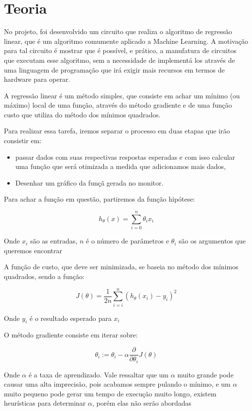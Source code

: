 \section{Teoria}

No projeto, foi desenvolvido um circuito que realiza o algoritmo de regressão linear, 
que é um algoritmo comumente aplicado a Machine Learning. 
A motivação para tal circuito é mostrar que é possível, e prático, 
a manufatura de circuitos que executam esse algoritmo, 
sem a necessidade de implementá los através de uma linguagem de programação que 
irá exigir mais recursos em termos de hardware para operar.

A regressão linear é um método simples, que consiste em achar um mínimo (ou máximo) 
local de uma função, através do método gradiente e de uma função custo 
que utiliza do método dos mínimos quadrados.

Para realizar essa tarefa, iremos separar o processo em duas etapas que irão consistir em: 

\begin{itemize}
    \item passar dados com suas respectivas respostas esperadas e com isso calcular uma 
            função que será otimizada a medida que adicionamos mais dados, 
    \item Desenhar um gráfico da funçã gerada no monitor.
\end{itemize}

Para achar a função em questão, partiremos da função hipótese:

$$h_\theta (x) = \sum_{i=0}^{n} \theta_i x_i$$

Onde $x_i$ são as entradas, $n$ é o número de parâmetros e 
$\theta_i$ são os argumentos que queremos encontrar

A função de custo, que deve ser minimizada, se baseia no método
dos mínimos quadrados, sendo a função:

$$ J(\theta) = \frac{1}{2n}\sum_{i=i}^{n}(h_\theta (x_i) - y_i)^2$$

Onde $y_i$ é o resultado esperado para $x_i$

O método gradiente consiste em iterar sobre:

$$ \theta_i := \theta_i - 
    \alpha \frac{\partial}{\partial \theta_i} J(\theta)$$

Onde $\alpha$ é a taxa de aprendizado. Vale ressaltar que um $\alpha$ 
muito grande pode causar uma alta imprecisão, pois acabamos sempre pulando o mínimo, 
e um $\alpha$ muito pequeno pode gerar um tempo de execução muito longo, 
existem heurísticas para determinar $\alpha$, porém elas não serão abordadas
